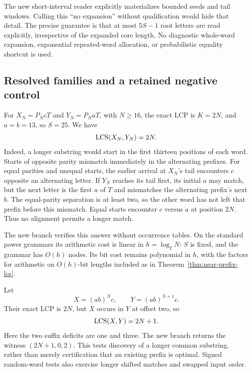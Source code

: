 The new short-interval reader explicitly materializes bounded seeds and
tail windows. Calling this ``no expansion'' without qualification would
hide that detail. The precise guarantee is that at most $5S-1$ root
letters are read explicitly, irrespective of the expanded core length.
No diagnostic whole-word expansion, exponential repeated-word allocation,
or probabilistic equality shortcut is used.

\subsection{Resolved families and a retained negative control}

\begin{example}
For $X_N=P_NcT$ and $Y_N=P_NaT$, with $N\ge16$, the exact LCP is
$K=2N$, and $a=b=13$, so $S=25$. We have
\[
 \operatorname{LCS}(X_N,Y_N)=2N.
\]
Indeed, a longer substring would start in the first thirteen positions
of each word. Starts of opposite parity mismatch immediately in the
alternating prefixes. For equal parities and unequal starts, the earlier
arrival at $X_N$'s tail encounters $c$ opposite an alternating letter.
If $Y_N$ reaches its tail first, its initial $a$ may match, but the next
letter is the first $a$ of $T$ and mismatches the alternating prefix's
next $b$. The equal-parity separation is at least two, so the other
word has not left that prefix before this mismatch. Equal starts
encounter $c$ versus $a$ at position $2N$. Thus no alignment permits a
longer match.

The new branch verifies this answer without occurrence tables. On the
standard power grammars its arithmetic cost is linear in
$h=\log_2N$: $S$ is fixed, and the grammar has $O(h)$ nodes. Its bit
cost remains polynomial in $h$, with the factors for arithmetic on
$O(h)$-bit lengths included as in Theorem~\ref{thm:near-prefix-lcs}.
\end{example}

\begin{example}
Let
\[
 X=(ab)^Nc,\qquad Y=(ab)^{N+1}c.
\]
Their exact LCP is $2N$, but $X$ occurs in $Y$ at offset two, so
\[
 \operatorname{LCS}(X,Y)=2N+1.
\]
Here the two suffix deficits are one and three. The new branch returns
the witness $(2N+1,0,2)$. This tests discovery of a longer common
substring, rather than merely certification that an existing prefix is
optimal. Signed random-word tests also exercise longer shifted matches
and swapped input order.
\end{example}

